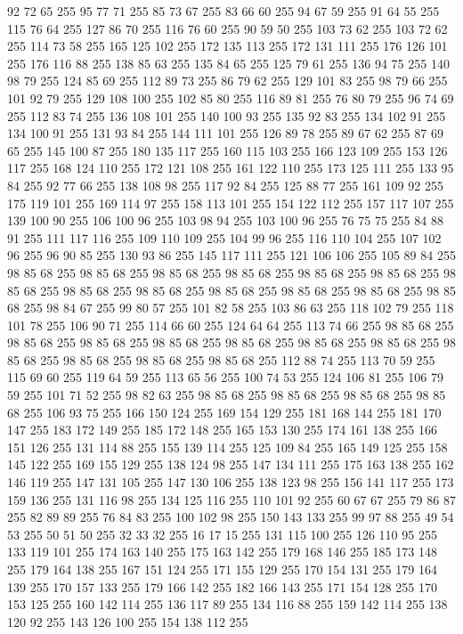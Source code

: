 92 72 65 255 95 77 71 255 85 73 67 255 83 66 60 255 94 67 59 255 91 64 55 255 115 76 64 255 127 86 70 255 116 76 60 255 90 59 50 255 103 73 62 255 103 72 62 255 114 73 58 255 165 125 102 255 172 135 113 255 172 131 111 255 176 126 101 255 176 116 88 255 138 85 63 255 135 84 65 255 125 79 61 255 136 94 75 255 140 98 79 255 124 85 69 255 112 89 73 255 86 79 62 255 129 101 83 255 98 79 66 255 101 92 79 255 129 108 100 255 102 85 80 255 116 89 81 255 76 80 79 255 96 74 69 255 112 83 74 255 136 108 101 255 140 100 93 255 135 92 83 255 134 102 91 255 134 100 91 255 131 93 84 255 144 111 101 255 126 89 78 255 89 67 62 255 87 69 65 255 145 100 87 255 180 135 117 255 160 115 103 255 166 123 109 255 153 126 117 255 168 124 110 255 172 121 108 255 161 122 110 255 173 125 111 255 133 95 84 255 92 77 66 255 138 108 98 255 117 92 84 255 125 88 77 255 161 109 92 255 175 119 101 255 169 114 97 255 158 113 101 255 154 122 112 255
157 117 107 255 139 100 90 255 106 100 96 255 103 98 94 255 103 100 96 255 76 75 75 255 84 88 91 255 111 117 116 255 109 110 109 255 104 99 96 255 116 110 104 255 107 102 96 255 96 90 85 255 130 93 86 255 145 117 111 255 121 106 106 255 105 89 84 255 98 85 68 255 98 85 68 255 98 85 68 255 98 85 68 255 98 85 68 255 98 85 68 255 98 85 68 255 98 85 68 255 98 85 68 255 98 85 68 255 98 85 68 255 98 85 68 255 98 85 68 255 98 84 67 255 99 80 57 255 101 82 58 255 103 86 63 255 118 102 79 255 118 101 78 255 106 90 71 255 114 66 60 255 124 64 64 255 113 74 66 255 98 85 68 255 98 85 68 255 98 85 68 255 98 85 68 255 98 85 68 255 98 85 68 255 98 85 68 255 98 85 68 255 98 85 68 255 98 85 68 255 98 85 68 255 112 88 74 255 113 70 59 255 115 69 60 255 119 64 59 255 113 65 56 255 100 74 53 255 124 106 81 255 106 79 59 255 101 71 52 255 98 82 63 255 98 85 68 255 98 85 68 255 98 85 68 255
98 85 68 255 106 93 75 255 166 150 124 255 169 154 129 255 181 168 144 255 181 170 147 255 183 172 149 255 185 172 148 255 165 153 130 255 174 161 138 255 166 151 126 255 131 114 88 255 155 139 114 255 125 109 84 255 165 149 125 255 158 145 122 255 169 155 129 255 138 124 98 255 147 134 111 255 175 163 138 255 162 146 119 255 147 131 105 255 147 130 106 255 138 123 98 255 156 141 117 255 173 159 136 255 131 116 98 255 134 125 116 255 110 101 92 255 60 67 67 255 79 86 87 255 82 89 89 255 76 84 83 255 100 102 98 255 150 143 133 255 99 97 88 255 49 54 53 255 50 51 50 255 32 33 32 255 16 17 15 255 131 115 100 255 126 110 95 255 133 119 101 255 174 163 140 255 175 163 142 255 179 168 146 255 185 173 148 255 179 164 138 255 167 151 124 255 171 155 129 255 170 154 131 255 179 164 139 255 170 157 133 255 179 166 142 255 182 166 143 255 171 154 128 255 170 153 125 255 160 142 114 255 136 117 89 255 134 116 88 255 159 142 114 255 138 120 92 255 143 126 100 255 154 138 112 255
